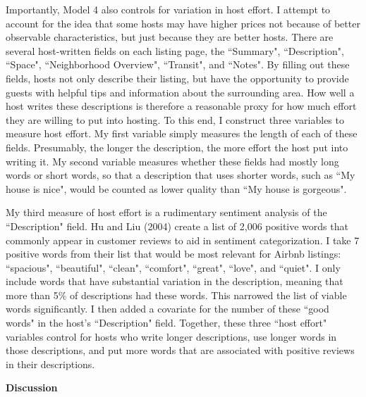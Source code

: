 \documentclass[11pt, oneside]{article}
\begin{document}
Importantly, Model 4 also controls for variation in host effort. I attempt to account for the idea that some hosts may have higher prices not because of better observable characteristics, but just because they are better hosts. There are several host-written fields on each listing page, the ``Summary", ``Description", ``Space", ``Neighborhood Overview", ``Transit", and ``Notes". By filling out these fields, hosts not only describe their listing, but have the opportunity to provide guests with helpful tips and information about the surrounding area. How well a host writes these descriptions is therefore a reasonable proxy for how much effort they are willing to put into hosting. To this end, I construct three variables to measure host effort. My first variable simply measures the length of each of these fields. Presumably, the longer the description, the more effort the host put into writing it. My second variable measures whether these fields had mostly long words or short words, so that a description that uses shorter words, such as ``My house is nice", would be counted as lower quality than ``My house is gorgeous". 

My third measure of host effort is a rudimentary sentiment analysis of the ``Description" field. Hu and Liu (2004) create a list of 2,006 positive words that commonly appear in customer reviews to aid in sentiment categorization.\cite{hu} I take 7 positive words from their list that would be most relevant for Airbnb listings: ``spacious", ``beautiful", ``clean", ``comfort", ``great", ``love", and ``quiet". I only include words that have substantial variation in the description, meaning that more than 5\% of descriptions had these words. This narrowed the list of viable words significantly. I then added a covariate for the number of these ``good words" in the host's ``Description" field. Together, these three ``host effort" variables control for hosts who write longer descriptions, use longer words in those descriptions, and put more words that are associated with positive reviews in their descriptions. 

\textbf{Discussion}
\end{document}
